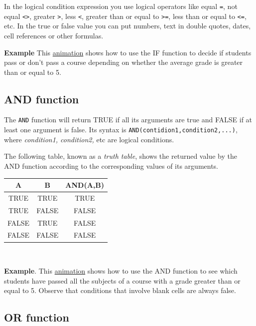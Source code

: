In the logical condition expression you use logical operators like equal \texttt{=}, not equal
\texttt{\textless{}\textgreater{}}, greater \texttt{\textgreater{}}, less \texttt{\textless{}}, greater than or equal to
\texttt{\textgreater{}=}, less than or equal to \texttt{\textless{}=}, etc. In the true or false value you can put
numbers, text in double quotes, dates, cell references or other formulas.

\textbf{Example} This \href{http://aprendeconalf.es/office/excel/manual/img/example_function_if.gif}{animation} shows how to use the IF function to decide if students pass or don't pass a course depending on whether the average grade is greater than or equal to 5.

\subsection{AND function}\hypertarget{and-function}{}\label{and-function}

The \texttt{AND} function will return TRUE if all its arguments are true and FALSE if at least one argument is false. Its syntax is \texttt{AND(contidion1,condition2,...)}, where \emph{condition1, condition2,} etc are logical conditions.

The following table, known as a \emph{truth table}, shows the returned value by the AND function according to the
corresponding values of its arguments.

\begin{longtable}{|c|c|c|}
\hline
A & B & AND(A,B)\\
\hline
TRUE & TRUE & TRUE\\
TRUE & FALSE & FALSE\\
FALSE & TRUE & FALSE\\
FALSE & FALSE & FALSE\\
\hline
\end{longtable}

~{}

\textbf{Example}. This \href{http://aprendeconalf.es/office/excel/manual/img/example_function_and.gif}{animation} shows how to use the AND function to see which students have passed all the subjects of a course with a grade greater than or equal to 5. Observe that conditions that involve blank cells are always false.

\subsection{OR function}\hypertarget{or-function}{}\label{or-function}

